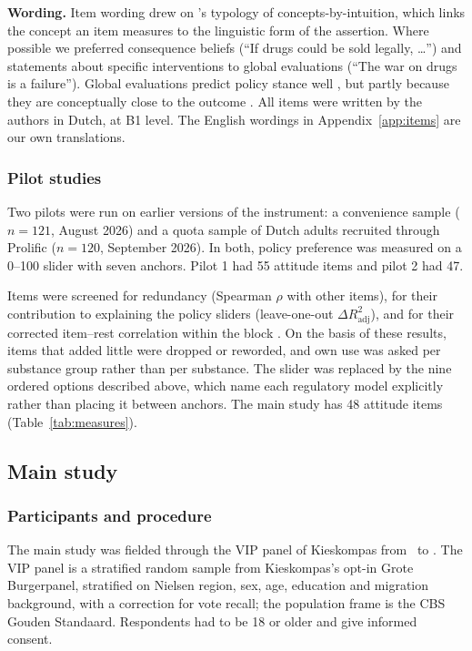 \textbf{Wording.} Item wording drew on \citeauthor{saris2004}'s \citeyearpar{saris2004} typology of
concepts-by-intuition, which links the concept an item measures to the linguistic form of the
assertion. Where possible we preferred consequence beliefs (``If drugs could be sold legally, \ldots'')
and statements about specific interventions to global evaluations (``The war on drugs is a failure'').
Global evaluations predict policy stance well \parencite{bergquist2022}, but partly because they are
conceptually close to the outcome \parencite{vysevkova2026}. All items were written by the authors in
Dutch, at B1 level. The English wordings in Appendix~\ref{app:items} are our own translations.

\subsubsection{Pilot studies}

Two pilots were run on earlier versions of the instrument: a convenience sample ($n = 121$, August
2026) and a quota sample of Dutch adults recruited through Prolific ($n = 120$, September 2026). In
both, policy preference was measured on a 0--100 slider with seven anchors. Pilot 1 had 55 attitude
items and pilot 2 had 47.

Items were screened for redundancy (Spearman $\rho$ with other items), for their contribution to
explaining the policy sliders (leave-one-out $\Delta R^2_{\mathrm{adj}}$), and for their corrected
item--rest correlation within the block \parencite{burger2022,chambon2026}. On the basis of these
results, items that added little were dropped or reworded, and own use was asked per substance group
rather than per substance. The slider was replaced by the nine ordered options described above, which
name each regulatory model explicitly rather than placing it between anchors. The main study has 48
attitude items (Table~\ref{tab:measures}).

\subsection{Main study}

\subsubsection{Participants and procedure}

The main study was fielded through the VIP panel of Kieskompas from \fieldStart\ to \fieldEnd. The VIP
panel is a stratified random sample from Kieskompas's opt-in Grote Burgerpanel, stratified on Nielsen
region, sex, age, education and migration background, with a correction for vote recall; the
population frame is the CBS Gouden Standaard. Respondents had to be 18 or older and give informed
consent.

